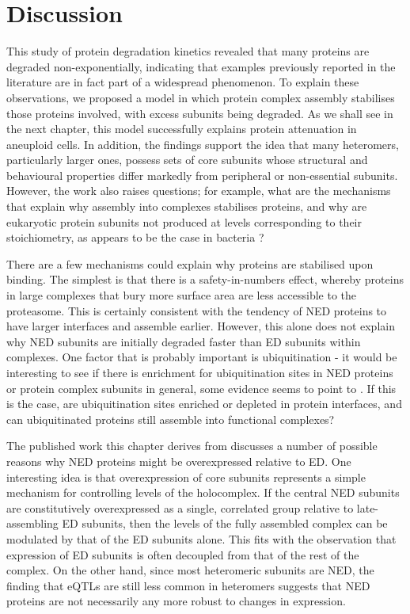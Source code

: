 \documentclass[a4paper,11pt,twoside,openright]{scrbook}
\begin{document}
\section{Discussion}

This study of protein degradation kinetics revealed that many proteins are degraded non-exponentially, indicating that examples previously reported in the literature are in fact part of a widespread phenomenon. To explain these observations, we proposed a model in which protein complex assembly stabilises those proteins involved, with excess subunits being degraded. As we shall see in the next chapter, this model successfully explains protein attenuation in aneuploid cells. In addition, the findings support the idea that many heteromers, particularly larger ones, possess sets of core subunits whose structural and behavioural properties differ markedly from peripheral or non-essential subunits. However, the work also raises questions; for example, what are the mechanisms that explain why assembly into complexes stabilises proteins, and why are eukaryotic protein subunits not produced at levels corresponding to their stoichiometry, as appears to be the case in bacteria \cite{Li2014b}?

There are a few mechanisms could explain why proteins are stabilised upon binding. The simplest is that there is a safety-in-numbers effect, whereby proteins in large complexes that bury more surface area are less accessible to the proteasome. This is certainly consistent with the tendency of NED proteins to have larger interfaces and assemble earlier. However, this alone does not explain why NED subunits are initially degraded faster than ED subunits within complexes. One factor that is probably important is ubiquitination - it would be interesting to see if there is enrichment for ubiquitination sites in NED proteins or protein complex subunits in general, some evidence seems to point to \cite{Chen2014}. If this is the case, are ubiquitination sites enriched or depleted in protein interfaces, and can ubiquitinated proteins still assemble into functional complexes?

The published work this chapter derives from discusses a number of possible reasons why NED proteins might be overexpressed relative to ED. One interesting idea is that overexpression of core subunits represents a simple mechanism for controlling levels of the holocomplex. If the central NED subunits are constitutively overexpressed as a single, correlated group relative to late-assembling ED subunits, then the levels of the fully assembled complex can be modulated by that of the ED subunits alone. This fits with the observation that expression of ED subunits is often decoupled from that of the rest of the complex. On the other hand, since most heteromeric subunits are NED, the finding that eQTLs are still less common in heteromers suggests that NED proteins are not necessarily any more robust to changes in expression.
\end{document}

